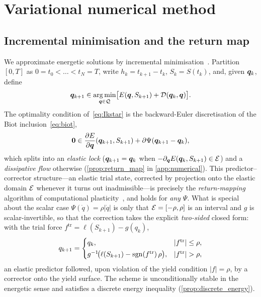 \section{Variational numerical method}\label{sec:numerical}

\subsection{Incremental minimisation and the return map}
\label{sec:incremental}

We approximate energetic solutions by incremental
minimisation~\cite{ortiz1999tq,mielke2008zb,conti2008,romero2021dd}.
Partition $[0,T]$ as $0=t_0<\dots<t_N=T$, write $h_k=t_{k+1}-t_k$,
$S_k=S(t_k)$, and, given $\bm{q}_k$, define
\begin{equation}\label{eq:Ikstar}
  \bm{q}_{k+1}\in\operatorname*{arg\,min}_{\bm{q}\in\mathcal{Q}}
  \bigl[E(\bm{q},S_{k+1})+\mathcal{D}(\bm{q}_k,\bm{q})\bigr].
\end{equation}
The optimality condition of~\eqref{eq:Ikstar} is the backward-Euler
discretisation of the Biot inclusion~\eqref{eq:biot},
\begin{equation}\label{eq:discrete_inclusion}
  \bm{0}\in\frac{\partial E}{\partial\bm{q}}(\bm{q}_{k+1},S_{k+1})
  +\partial\Psi(\bm{q}_{k+1}-\bm{q}_k),
\end{equation}
which splits into an \emph{elastic lock}
($\bm{q}_{k+1}=\bm{q}_k$ when $-\partial_{\bm{q}}E(\bm{q}_k,S_{k+1})\in\mathcal{E}$)
and a \emph{dissipative flow} otherwise (\cref{prop:return_map} in
\cref{app:numerical}). This predictor--corrector structure---an elastic
trial state, corrected by projection onto the elastic domain $\mathcal{E}$
whenever it turns out inadmissible---is precisely the
\emph{return-mapping} algorithm of computational
plasticity~\cite{Simo1986,hanreddy2013}, and holds for \emph{any}
$\Psi$. What is special about the scalar case $\Psi(\dot q)=\rho|\dot q|$
is only that $\mathcal{E}=[-\rho,\rho]$ is an interval and $g$ is
scalar-invertible, so that the correction takes the explicit
\emph{two-sided} closed form: with the trial force
$f^{\mathrm{tr}}=\ell(S_{k+1})-g(q_k)$,
\begin{equation}\label{eq:scalar_return_map}
  q_{k+1}=
  \begin{cases}
    q_k, & |f^{\mathrm{tr}}|\le\rho, \\[2pt]
    g^{-1}\!\bigl(\ell(S_{k+1})-\sgn(f^{\mathrm{tr}})\,\rho\bigr),
      & |f^{\mathrm{tr}}|>\rho,
  \end{cases}
\end{equation}
an elastic predictor followed, upon violation of the yield condition
$|f|=\rho$, by a corrector onto the yield surface. The scheme is
unconditionally stable in the energetic sense and satisfies a discrete
energy inequality (\cref{prop:discrete_energy}).


